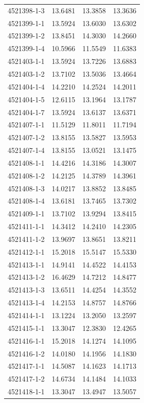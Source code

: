 \begin{longtable}{lrrr}
4521398-1-3 & 13.6481 & 13.3858 & 13.3636 \\
4521399-1-1 & 13.5924 & 13.6030 & 13.6302 \\
4521399-1-2 & 13.8451 & 14.3030 & 14.2660 \\
4521399-1-4 & 10.5966 & 11.5549 & 11.6383 \\
4521403-1-1 & 13.5924 & 13.7226 & 13.6883 \\
4521403-1-2 & 13.7102 & 13.5036 & 13.4664 \\
4521404-1-4 & 14.2210 & 14.2524 & 14.2011 \\
4521404-1-5 & 12.6115 & 13.1964 & 13.1787 \\
4521404-1-7 & 13.5924 & 13.6137 & 13.6371 \\
4521407-1-1 & 11.5129 & 11.8011 & 11.7194 \\
4521407-1-2 & 13.8155 & 13.5827 & 13.5953 \\
4521407-1-4 & 13.8155 & 13.0521 & 13.1475 \\
4521408-1-1 & 14.4216 & 14.3186 & 14.3007 \\
4521408-1-2 & 14.2125 & 14.3789 & 14.3961 \\
4521408-1-3 & 14.0217 & 13.8852 & 13.8485 \\
4521408-1-4 & 13.6181 & 13.7465 & 13.7302 \\
4521409-1-1 & 13.7102 & 13.9294 & 13.8415 \\
4521411-1-1 & 14.3412 & 14.2410 & 14.2305 \\
4521411-1-2 & 13.9697 & 13.8651 & 13.8211 \\
4521412-1-1 & 15.2018 & 15.5147 & 15.5330 \\
4521413-1-1 & 14.9141 & 14.4522 & 14.4153 \\
4521413-1-2 & 16.4629 & 14.7212 & 14.8477 \\
4521413-1-3 & 13.6511 & 14.4254 & 14.3552 \\
4521413-1-4 & 14.2153 & 14.8757 & 14.8766 \\
4521414-1-1 & 13.1224 & 13.2050 & 13.2597 \\
4521415-1-1 & 13.3047 & 12.3830 & 12.4265 \\
4521416-1-1 & 15.2018 & 14.1274 & 14.1095 \\
4521416-1-2 & 14.0180 & 14.1956 & 14.1830 \\
4521417-1-1 & 14.5087 & 14.1623 & 14.1713 \\
4521417-1-2 & 14.6734 & 14.1484 & 14.1033 \\
4521418-1-1 & 13.3047 & 13.4947 & 13.5057 \\

\end{longtable}
